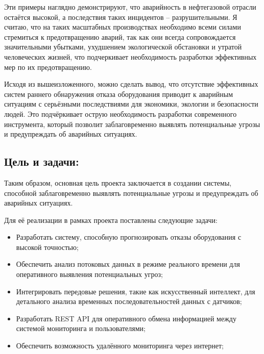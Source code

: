 \documentclass[a4paper,12pt]{article}
\begin{document}
\begin{flushleft}
Эти примеры наглядно демонстрируют, что аварийность в нефтегазовой отрасли остаётся высокой,
а последствия таких инцидентов – разрушительными.
Я считаю, что на таких масштабных производствах необходимо всеми силами стремиться к предотвращению аварий,
так как они всегда сопровождается значительными убытками, ухудшением экологической обстановки и утратой человеческих жизней,
что подчеркивает необходимость разработки эффективных мер по их предотвращению.


Исходя из вышеизложенного, можно сделать вывод, что отсутствие эффективных систем раннего
обнаружения отказа оборудования приводит к аварийным ситуациям с серьёзными последствиями
для экономики, экологии и безопасности людей.
Это подчёркивает острую необходимость разработки современного инструмента,
который позволит заблаговременно выявлять потенциальные угрозы и предупреждать об аварийных ситуациях.

\subsection{Цель и задачи: }

Таким образом, основная цель проекта заключается в создании системы,
способной заблаговременно выявлять потенциальные угрозы и предупреждать об аварийных ситуациях.

Для её реализации в рамках проекта поставлены следующие задачи:
\begin{itemize}
    \item Разработать систему, способную прогнозировать отказы оборудования с высокой точностью;
    \item Обеспечить анализ потоковых данных в режиме реального времени для оперативного выявления потенциальных угроз;
    \item Интегрировать передовые решения, такие как искусственный интеллект, для детального анализа временных последовательностей данных с датчиков;
    \item Разработать REST API для оперативного обмена информацией между системой мониторинга и пользователями;
    \item Обеспечить возможность удалённого мониторинга через интернет;
\end{itemize}
\end{flushleft}
\end{document}
